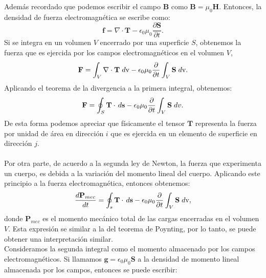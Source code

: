 \documentclass[11pt,fleqn]{book} %
\begin{document}
Adem\'as recordado que podemos escribir el campo $\textbf{B}$ como $\textbf{B}=\mu_{0}\textbf{H}$.
Entonces, la densidad de fuerza electromagn\'etica se escribe como:
\begin{equation}
\textbf{f}=\nabla\cdot\textbf{T}-\epsilon_{0}\mu_{0}\frac{\partial \textbf{S}}{\partial t}.
\end{equation}
Si se integra en un volumen $V$ encerrado por una superficie $S$, obtenemos la fuerza que es ejercida por los campos electromagn\'eticos en el volumen $V$,
\begin{eqnarray*}
\textbf{F}=\int_{V}\nabla\cdot\textbf{T}\hspace{1mm} d\text{v}-\epsilon_{0}\mu_{0}\frac{\partial}{\partial t}\int_{V} \textbf{S}\hspace{1mm} d\text{v}.
\end{eqnarray*}
Aplicando el teorema de la divergencia a la primera integral, obtenemos:
\begin{equation}
\textbf{F}=\oint_{S}\textbf{T}\cdot\hspace{0.5mm} d\textbf{s}-\epsilon_{0}\mu_{0}\frac{\partial}{\partial t}\int_{V} \textbf{S}\hspace{1mm} dv. \label{Fuerza}
\end{equation}
De esta forma podemos apreciar que f\'isicamente el tensor $\textbf{T}$ representa la fuerza por unidad de \'area en direcci\'on $i$ que es ejercida en un elemento de superficie en direcci\'on $j$.\\\\
Por otra parte, de acuerdo a la segunda ley de Newton, la fuerza que experimenta un cuerpo, es debida a la variaci\'on del momento lineal del cuerpo. Aplicando este principio a la fuerza electromagn\'etica, entonces obtenemos:
\begin{equation}
\frac{d \textbf{P}_{mec}}{dt}=\oint_{s}\textbf{T}\cdot\hspace{0.5mm} d\textbf{s}-\epsilon_{0}\mu_{0}\frac{\partial}{\partial t}\int_{V} \textbf{S}\hspace{1mm} d\text{v},
\end{equation}
donde $\textbf{P}_{mec}$ es el momento mec\'anico total de las cargas encerradas en el volumen $V$. Esta expresi\'on se similar a la del teorema de Poynting, por lo tanto, se puede obtener una interpretaci\'on similar.\\
Consideramos la segunda integral como el momento almacenado por los campos electromagn\'eticos.
Si llamamos $\textbf{g}=\epsilon_{0}\mu_{0}\textbf{S}$ a la densidad de momento lineal almacenada por los campos, entonces se puede escribir:
\end{document}
